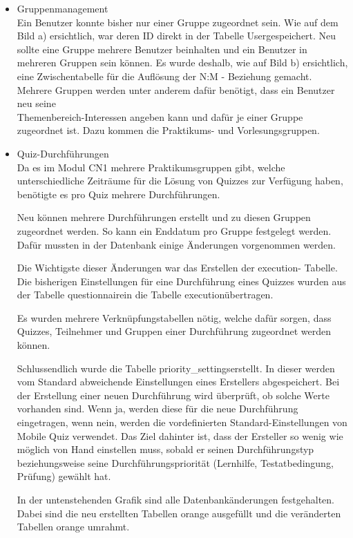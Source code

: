 \begin{itemize}
	\item Gruppenmanagement\\
	Ein Benutzer konnte bisher nur einer Gruppe zugeordnet sein. Wie auf dem Bild a) ersichtlich, war deren ID direkt in der Tabelle \glqq User\grqq gespeichert. Neu sollte eine Gruppe mehrere Benutzer beinhalten und ein Benutzer in mehreren Gruppen sein können. Es wurde deshalb, wie auf Bild b) ersichtlich, eine Zwischentabelle für die Auflösung der N:M - Beziehung gemacht.\\
	Mehrere Gruppen werden unter anderem dafür benötigt, dass ein Benutzer neu seine\\ Themenbereich-Interessen angeben kann und dafür je einer Gruppe zugeordnet ist. Dazu kommen die Praktikums- und Vorlesungsgruppen.
	\item Quiz-Durchführungen\\
	Da es im Modul \gls{CN1} mehrere Praktikumsgruppen gibt, welche unterschiedliche Zeiträume für die Lösung von Quizzes zur Verfügung haben, benötigte es pro Quiz mehrere Durchführungen.
	
	Neu können mehrere Durchführungen erstellt und zu diesen Gruppen zugeordnet werden. So kann ein Enddatum pro Gruppe festgelegt werden.
	Dafür mussten in der Datenbank einige Änderungen vorgenommen werden. 
	
	Die Wichtigste dieser Änderungen war das Erstellen der \glqq execution\grqq - Tabelle. Die bisherigen Einstellungen für eine Durchführung eines Quizzes wurden aus der Tabelle \glqq questionnaire\grqq in die Tabelle \glqq execution\grqq übertragen.
	
	Es wurden mehrere Verknüpfungstabellen nötig, welche dafür sorgen, dass Quizzes, Teilnehmer und Gruppen einer Durchführung zugeordnet werden können.
	
	Schlussendlich wurde die Tabelle \glqq priority\_settings\grqq erstellt. In dieser werden vom Standard abweichende Einstellungen eines Erstellers abgespeichert. Bei der Erstellung einer neuen Durchführung wird überprüft, ob solche Werte vorhanden sind. Wenn ja, werden diese für die neue Durchführung eingetragen, wenn nein, werden die vordefinierten Standard-Einstellungen von Mobile Quiz verwendet. Das Ziel dahinter ist, dass der Ersteller so wenig wie möglich von Hand einstellen muss, sobald er seinen Durchführungstyp beziehungsweise seine Durchführungspriorität (Lernhilfe, Testatbedingung, Prüfung) gewählt hat.
	
	In der untenstehenden Grafik sind alle Datenbankänderungen festgehalten. Dabei sind die neu erstellten Tabellen orange ausgefüllt und die veränderten Tabellen orange umrahmt.
	

\end{itemize}
